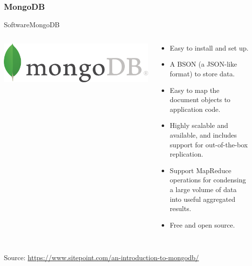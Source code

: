 \documentclass[11pt]{beamer}
\begin{document}
\subsubsection{MongoDB}
\begin{frame}{Software}{MongoDB}
  \begin{columns}
    \begin{column}{0.4\textwidth}
      \includegraphics[width=\linewidth]{mongodb_logo1-76twgcu2dm.png}
    \end{column}
    \begin{column}{0.7\textwidth}
      \begin{itemize}
        \item Easy to install and set up.
        \item A BSON (a JSON-like format) to store data.
        \item Easy to map the document objects to application code.
        \item Highly scalable and available, and includes support for out-of-the-box replication.
        \item Support MapReduce operations for condensing a large volume of data into useful aggregated results.
        \item Free and open source.\\\
      \end{itemize}
    \end{column}
\end{columns}

\tiny{Source: \url{https://www.sitepoint.com/an-introduction-to-mongodb/}}
\end{frame}
\end{document}
